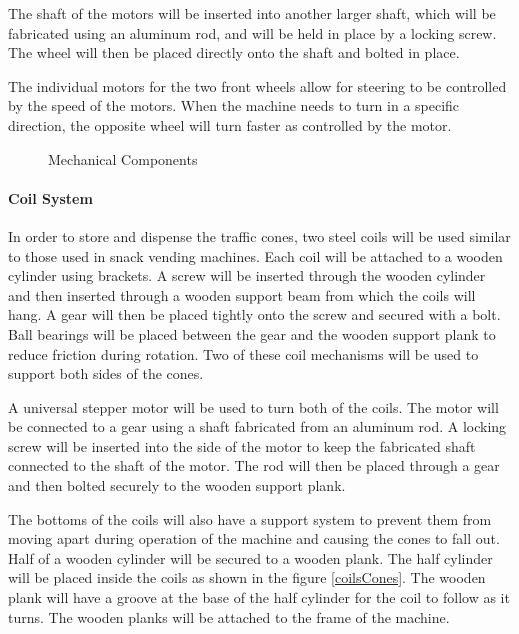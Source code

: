\documentclass[11pt]{report}
\begin{document}
The shaft of the motors will be inserted into another larger shaft, which will be fabricated using an aluminum rod, and will be held in place by a locking screw. The wheel will then be placed directly onto the shaft and bolted in place. 

The individual motors for the two front wheels allow for steering to be controlled by the speed of the motors. When the machine needs to turn in a specific direction, the opposite wheel will turn faster as controlled by the motor. 

\begin{figure}
  \centering
\hspace{20pt}             
  \caption{Mechanical Components}
\end{figure}

\paragraph{Coil System}

In order to store and dispense the traffic cones, two steel coils will be used similar to those used in snack vending machines. Each coil will be attached to a wooden cylinder using brackets. A screw will be inserted through the wooden cylinder and then inserted through a wooden support beam from which the coils will hang. A gear will then be placed tightly onto the screw and secured with a bolt. Ball bearings will be placed between the gear and the wooden support plank to reduce friction during rotation. Two of these coil mechanisms will be used to support both sides of the cones.  

A universal stepper motor will be used to turn both of the coils. The motor will be connected to a gear using a shaft fabricated from an aluminum rod. A locking screw will be inserted into the side of the motor to keep the fabricated shaft connected to the shaft of the motor. The rod will then be placed through a gear and then bolted securely to the wooden support plank. 

The bottoms of the coils will also have a support system to prevent them from moving apart during operation of the machine and causing the cones to fall out. Half of a wooden cylinder will be secured to a wooden plank. The half cylinder will be placed inside the coils as shown in the figure \ref{coilsCones}. The wooden plank will have a groove at the base of the half cylinder for the coil to follow as it turns. The wooden planks will be attached to the frame of the machine.
\end{document}
